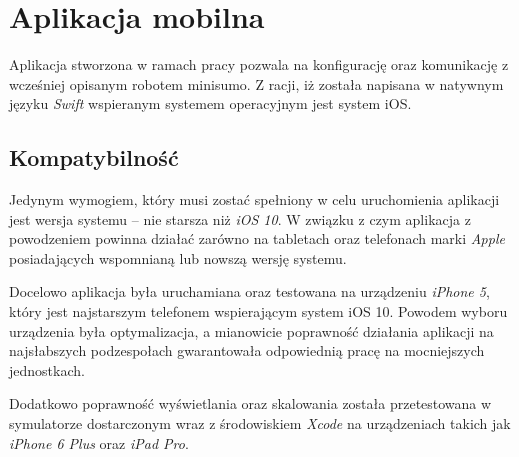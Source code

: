 \chapter{Aplikacja mobilna}
Aplikacja stworzona w ramach pracy pozwala na konfigurację oraz komunikację z wcześniej opisanym robotem minisumo. Z racji, iż została napisana w natywnym języku \textit{Swift} wspieranym systemem operacyjnym jest system iOS.

\section{Kompatybilność}
Jedynym wymogiem, który musi zostać spełniony w celu uruchomienia aplikacji jest wersja systemu – nie starsza niż \textit{iOS 10}. W związku z czym aplikacja z powodzeniem powinna działać zarówno na tabletach oraz telefonach marki \textit{Apple} posiadających wspomnianą lub nowszą wersję systemu. 

Docelowo aplikacja była uruchamiana oraz testowana na urządzeniu \textit{iPhone 5}, który jest najstarszym telefonem wspierającym system iOS 10. Powodem wyboru urządzenia była optymalizacja, a mianowicie poprawność działania aplikacji na najsłabszych podzespołach gwarantowała odpowiednią pracę na mocniejszych jednostkach.

Dodatkowo poprawność wyświetlania oraz skalowania została przetestowana w symulatorze dostarczonym wraz z środowiskiem \textit{Xcode} na urządzeniach takich jak \textit{iPhone 6 Plus} oraz \textit{iPad Pro}.
 
